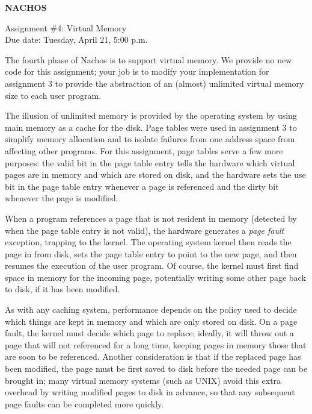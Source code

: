 	


\begin{center}
{\large {\bf NACHOS}}


\vspace{.5in}
Assignment \#4: Virtual Memory \\
Due date: Tuesday, April 21, 5:00 p.m. \\
\end{center}

\vspace{.2in}

The fourth phase of Nachos is to support virtual memory.
We provide no new code for this assignment; your job is
to modify your implementation for assignment 3 to provide
the abstraction of an (almost) unlimited virtual memory size
to each user program.  

The illusion of unlimited memory is provided by the operating system
by using main memory as a cache for the disk.
Page tables were used in assignment 3 to simplify memory 
allocation and to isolate failures from one address space from 
affecting other programs.  For this assignment, page tables 
serve a few more purposes: the valid bit in the page table entry tells
the hardware which virtual pages are in memory and which are stored on disk,
and the hardware sets the use bit in the page table entry whenever
a page is referenced and the dirty bit whenever the page is modified.

When a program references a page that is not resident in memory
(detected by when the page table entry is not valid), the hardware
generates a {\em page fault} exception, trapping to the kernel.
The operating system kernel then reads the page in from disk,
sets the page table entry to point to the new page, and then resumes 
the execution of the user program.  Of course, the kernel must  
first find space in memory for the incoming page, potentially
writing some other page back to disk, if it has been modified.

As with any caching system, performance depends on the policy
used to decide which things are kept in memory and which
are only stored on disk.  
On a page fault, the kernel must decide which page to replace;
ideally, it will throw out a page that will not referenced for 
a long time, keeping pages in memory those that are soon to be 
referenced.  Another consideration is that if the replaced page 
has been modified, the page must be first saved to disk before the needed
page can be brought in; many virtual memory systems (such as UNIX)
avoid this extra overhead by writing modified pages to disk in 
advance, so that any subsequent page faults can be completed more quickly.

